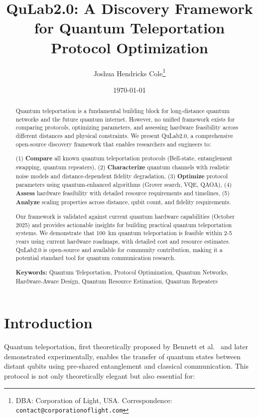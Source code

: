 \documentclass[11pt,a4paper]{article}
\title{QuLab2.0: A Discovery Framework for Quantum Teleportation Protocol Optimization}
\author{Joshua Hendricks Cole\thanks{DBA: Corporation of Light, USA. Correspondence: \texttt{contact@corporationoflight.com}}}
\date{\today}
\begin{document}
\maketitle

\begin{abstract}
Quantum teleportation is a fundamental building block for long-distance quantum networks and the future quantum internet. However, no unified framework exists for comparing protocols, optimizing parameters, and assessing hardware feasibility across different distances and physical constraints. We present QuLab2.0, a comprehensive open-source discovery framework that enables researchers and engineers to:

(1) \textbf{Compare} all known quantum teleportation protocols (Bell-state, entanglement swapping, quantum repeaters),
(2) \textbf{Characterize} quantum channels with realistic noise models and distance-dependent fidelity degradation,
(3) \textbf{Optimize} protocol parameters using quantum-enhanced algorithms (Grover search, VQE, QAOA),
(4) \textbf{Assess} hardware feasibility with detailed resource requirements and timelines,
(5) \textbf{Analyze} scaling properties across distance, qubit count, and fidelity requirements.

Our framework is validated against current quantum hardware capabilities (October 2025) and provides actionable insights for building practical quantum teleportation systems. We demonstrate that 100~km quantum teleportation is feasible within 2-5 years using current hardware roadmaps, with detailed cost and resource estimates. QuLab2.0 is open-source and available for community contribution, making it a potential standard tool for quantum communication research.

\textbf{Keywords:} Quantum Teleportation, Protocol Optimization, Quantum Networks, Hardware-Aware Design, Quantum Resource Estimation, Quantum Repeaters
\end{abstract}

\section{Introduction}

Quantum teleportation, first theoretically proposed by Bennett et al.~\cite{bennett1993} and later demonstrated experimentally, enables the transfer of quantum states between distant qubits using pre-shared entanglement and classical communication. This protocol is not only theoretically elegant but also essential for:
\end{document}
